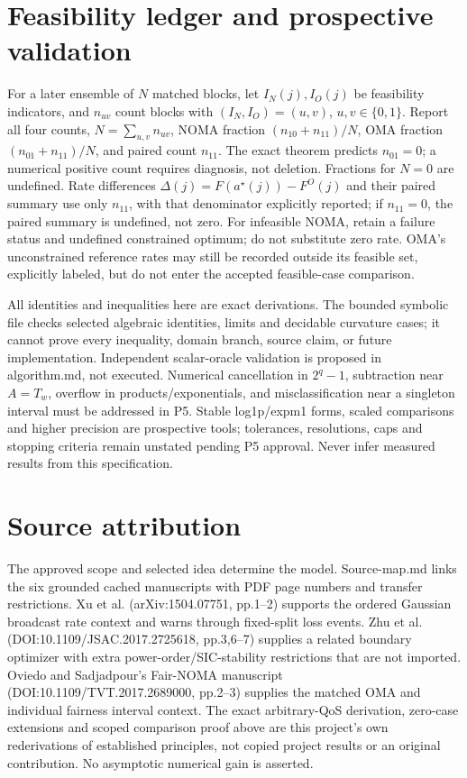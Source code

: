\documentclass[11pt]{article}
\begin{document}
\section{Feasibility ledger and prospective validation}
For a later ensemble of \(N\) matched blocks, let \(I_N(j),I_O(j)\)
be feasibility indicators, and \(n_{uv}\) count blocks with
\((I_N,I_O)=(u,v)\), \(u,v\in\{0,1\}\). Report all four counts,
\(N=\sum_{u,v}n_{uv}\), NOMA fraction \((n_{10}+n_{11})/N\),
OMA fraction \((n_{01}+n_{11})/N\), and paired count \(n_{11}\).
The exact theorem predicts \(n_{01}=0\); a numerical positive count
requires diagnosis, not deletion. Fractions for \(N=0\) are undefined.
Rate differences \(\Delta(j)=F(a^\star(j))-F^O(j)\) and their paired
summary use only \(n_{11}\), with that denominator explicitly reported;
if \(n_{11}=0\), the paired summary is undefined, not zero.
For infeasible NOMA, retain a failure status and undefined constrained
optimum; do not substitute zero rate. OMA's unconstrained reference rates
may still be recorded outside its feasible set, explicitly labeled, but
do not enter the accepted feasible-case comparison.

All identities and inequalities here are exact derivations. The bounded
symbolic file checks selected algebraic identities, limits and decidable
curvature cases; it cannot prove every inequality, domain branch, source
claim, or future implementation. Independent scalar-oracle validation is
proposed in algorithm.md, not executed. Numerical cancellation in
\(2^q-1\), subtraction near \(A=T_w\), overflow in products/exponentials,
and misclassification near a singleton interval must be addressed in P5.
Stable log1p/expm1 forms, scaled comparisons and higher precision are
prospective tools; tolerances, resolutions, caps and stopping criteria
remain unstated pending P5 approval. Never infer measured results from
this specification.

\section{Source attribution}
The approved scope and selected idea determine the model. Source-map.md
links the six grounded cached manuscripts with PDF page numbers and transfer
restrictions. Xu et al. (arXiv:1504.07751, pp.1--2) supports the ordered
Gaussian broadcast rate context and warns through fixed-split loss events.
Zhu et al. (DOI:10.1109/JSAC.2017.2725618, pp.3,6--7) supplies a related
boundary optimizer with extra power-order/SIC-stability restrictions that
are not imported. Oviedo and Sadjadpour's Fair-NOMA manuscript
(DOI:10.1109/TVT.2017.2689000, pp.2--3) supplies the matched OMA and
individual fairness interval context. The exact arbitrary-QoS derivation,
zero-case extensions and scoped comparison proof above are this project's
own rederivations of established principles, not copied project results
or an original contribution. No asymptotic numerical gain is asserted.
\end{document}
